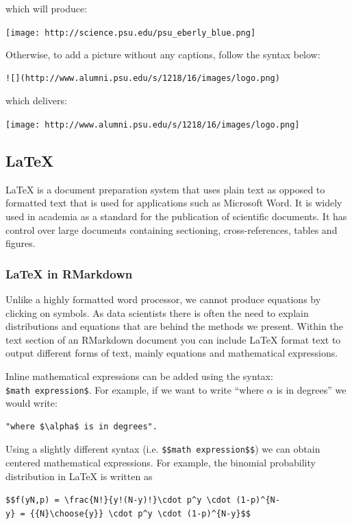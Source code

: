 \documentclass[12pt,]{krantz}
\begin{document}
which will produce:

\texttt{[image: http://science.psu.edu/psu\_eberly\_blue.png]}

Otherwise, to add a picture without any captions, follow the syntax
below:

\begin{verbatim}
![](http://www.alumni.psu.edu/s/1218/16/images/logo.png)
\end{verbatim}

which delivers:

\texttt{[image: http://www.alumni.psu.edu/s/1218/16/images/logo.png]}

\subsection{LaTeX}\label{latex}

LaTeX is a document preparation system that uses plain text as opposed
to formatted text that is used for applications such as Microsoft Word.
It is widely used in academia as a standard for the publication of
scientific documents. It has control over large documents containing
sectioning, cross-references, tables and figures.

\subsubsection{LaTeX in RMarkdown}\label{latex-in-rmarkdown}

Unlike a highly formatted word processor, we cannot produce equations by
clicking on symbols. As data scientists there is often the need to
explain distributions and equations that are behind the methods we
present. Within the text section of an RMarkdown document you can
include LaTeX format text to output different forms of text, mainly
equations and mathematical expressions.

Inline mathematical expressions can be added using the syntax:
\texttt{\$math\ expression\$}. For example, if we want to write ``where
\(\alpha\) is in degrees'' we would write:

\begin{verbatim}
"where $\alpha$ is in degrees".
\end{verbatim}

Using a slightly different syntax (i.e.
\texttt{\$\$math\ expression\$\$}) we can obtain centered mathematical
expressions. For example, the binomial probability distribution in LaTeX
is written as

\texttt{\$\$f(y\textbar{}N,p)\ =\ \textbackslash{}frac\{N!\}\{y!(N-y)!\}\textbackslash{}cdot\ p\^{}y\ \textbackslash{}cdot\ (1-p)\^{}\{N-y\}\ =\ \{\{N\}\textbackslash{}choose\{y\}\}\ \textbackslash{}cdot\ p\^{}y\ \textbackslash{}cdot\ (1-p)\^{}\{N-y\}\$\$}
\end{document}
